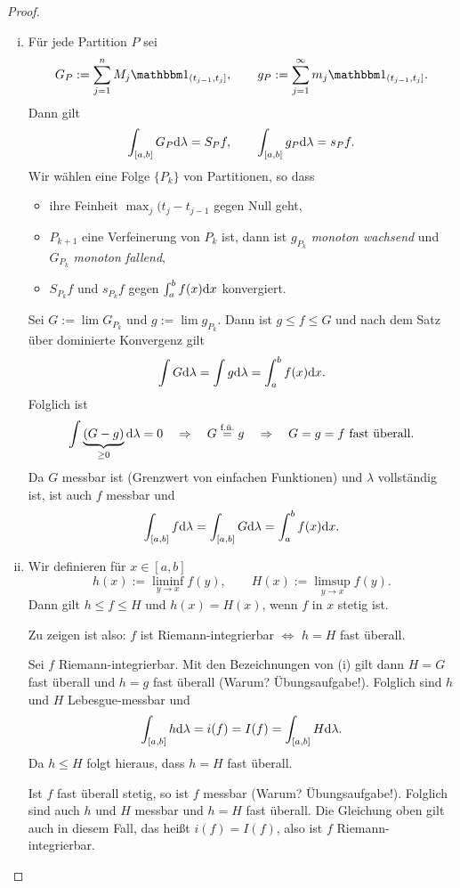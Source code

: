 \documentclass[
 a4paper,
 12pt,
 parskip=half
 ]{scrreprt}
\theoremstyle{plain}
\theoremstyle{definition}
\numberwithin{equation}{section}
\begin{document}
\begin{proof}
 \begin{enumerate}[(i)]
  \item Für jede Partition $P$ sei
  \[ G_P := \sum_{j=1}^n M_j \ind_{(t_{j-1},t_j]}, \qquad g_P := \sum_{j=1}^\infty m_j \ind_{(t_{j-1},t_j]}. \]
  Dann gilt
  \[ \int_{[a,b]} G_P \mathrm{d} \lambda = S_P f, \qquad \int_{[a,b]} g_P \mathrm{d} \lambda = s_P f. \]
  Wir wählen eine Folge $\{ P_k \}$ von Partitionen, so dass
  \begin{itemize}
   \item ihre Feinheit $\max_j (t_j - t_{j-1}$ gegen Null geht,
   \item $P_{k+1}$ eine Verfeinerung von $P_k$ ist, dann ist $g_{P_k}$ \emph{monoton wachsend} und $G_{P_k}$ \emph{monoton fallend},
   \item $S_{P_k} f$ und $s_{P_k} f$ gegen $\int_a^b f(x) \mathrm{d} x$ konvergiert.
  \end{itemize}
  Sei $G := \lim G_{P_k}$ und $g := \lim g_{P_k}$. Dann ist $g \le f \le G$ und nach dem Satz über dominierte Konvergenz gilt
  \[ \int G \mathrm{d} \lambda = \int g \mathrm{d} \lambda = \int_a^b f(x) \mathrm{d} x. \]
  Folglich ist
  \[ \int \underbrace{(G-g)}_{\ge 0} \mathrm{d} \lambda = 0 \quad \Rightarrow \quad G \overset{\text{f.ü.}}{=} g \quad \Rightarrow \quad G=g=f \text{ fast überall.} \]
  Da $G$ messbar ist (Grenzwert von einfachen Funktionen) und $\lambda$ vollständig ist, ist auch $f$ messbar und
  \[ \int_{[a,b]} f \mathrm{d} \lambda = \int_{[a,b]} G \mathrm{d} \lambda = \int_a^b f(x) \mathrm{d} x. \]
  \item Wir definieren für $x \in [a,b]$
  \[ h(x) := \liminf_{y \to x} f(y), \qquad H(x) := \limsup_{y \to x} f(y). \]
  Dann gilt $h \le f \le H$ und $h(x) = H(x)$, wenn $f$ in $x$ stetig ist.
  
  Zu zeigen ist also: $f$ ist Riemann-integrierbar $\Leftrightarrow$ $h = H$ fast überall.
  
  Sei $f$ Riemann-integrierbar. Mit den Bezeichnungen von (i) gilt dann $H = G$ fast überall und $h=g$ fast überall (Warum? Übungsaufgabe!). Folglich sind $h$ und $H$ Lebesgue-messbar und
  \[ \int_{[a,b]} h \mathrm{d} \lambda = i(f) = I(f) = \int_{[a,b]} H \mathrm{d} \lambda. \]
  Da $h \le H$ folgt hieraus, dass $h = H$ fast überall.
  
  Ist $f$ fast überall stetig, so ist $f$ messbar (Warum? Übungsaufgabe!). Folglich sind auch $h$ und $H$ messbar und $h = H$ fast überall. Die Gleichung oben gilt auch in diesem Fall, das heißt $i(f) = I(f)$, also ist $f$ Riemann-integrierbar. \qedhere
 \end{enumerate}
\end{proof}
\end{document}
